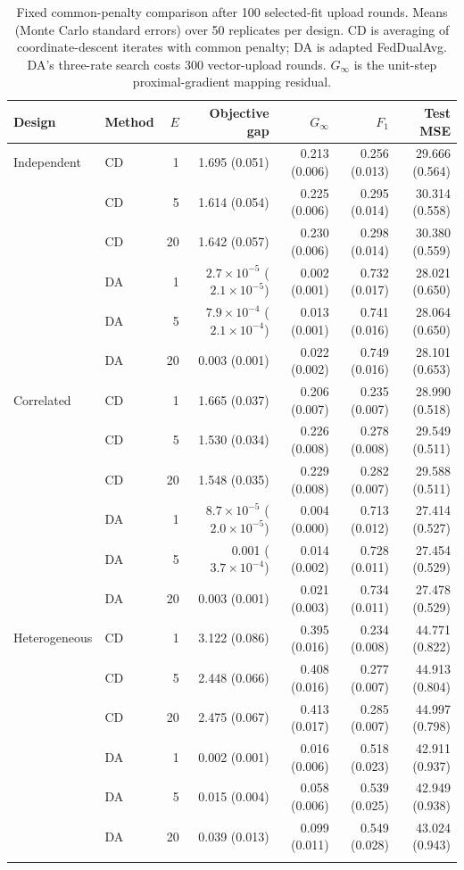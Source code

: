 \begin{table}[t]
\centering\small
\setlength{\tabcolsep}{3pt}
\caption{Fixed common-penalty comparison after 100 selected-fit upload rounds. Means (Monte Carlo standard errors) over 50 replicates per design. CD is averaging of coordinate-descent iterates with common penalty; DA is adapted FedDualAvg. DA's three-rate search costs 300 vector-upload rounds. $G_\infty$ is the unit-step proximal-gradient mapping residual.}
\label{tab:budget}
\begin{tabular}{llrrrrr}
\toprule
Design & Method & $E$ & Objective gap & $G_\infty$ & $F_1$ & Test MSE \\
\midrule
Independent & CD & 1 & 1.695 (0.051) & 0.213 (0.006) & 0.256 (0.013) & 29.666 (0.564) \\
 & CD & 5 & 1.614 (0.054) & 0.225 (0.006) & 0.295 (0.014) & 30.314 (0.558) \\
 & CD & 20 & 1.642 (0.057) & 0.230 (0.006) & 0.298 (0.014) & 30.380 (0.559) \\
 & DA & 1 & $2.7\times10^{-5}$ ($2.1\times10^{-5}$) & 0.002 (0.001) & 0.732 (0.017) & 28.021 (0.650) \\
 & DA & 5 & $7.9\times10^{-4}$ ($2.1\times10^{-4}$) & 0.013 (0.001) & 0.741 (0.016) & 28.064 (0.650) \\
 & DA & 20 & 0.003 (0.001) & 0.022 (0.002) & 0.749 (0.016) & 28.101 (0.653) \\
\addlinespace
Correlated & CD & 1 & 1.665 (0.037) & 0.206 (0.007) & 0.235 (0.007) & 28.990 (0.518) \\
 & CD & 5 & 1.530 (0.034) & 0.226 (0.008) & 0.278 (0.008) & 29.549 (0.511) \\
 & CD & 20 & 1.548 (0.035) & 0.229 (0.008) & 0.282 (0.007) & 29.588 (0.511) \\
 & DA & 1 & $8.7\times10^{-5}$ ($2.0\times10^{-5}$) & 0.004 (0.000) & 0.713 (0.012) & 27.414 (0.527) \\
 & DA & 5 & 0.001 ($3.7\times10^{-4}$) & 0.014 (0.002) & 0.728 (0.011) & 27.454 (0.529) \\
 & DA & 20 & 0.003 (0.001) & 0.021 (0.003) & 0.734 (0.011) & 27.478 (0.529) \\
\addlinespace
Heterogeneous & CD & 1 & 3.122 (0.086) & 0.395 (0.016) & 0.234 (0.008) & 44.771 (0.822) \\
 & CD & 5 & 2.448 (0.066) & 0.408 (0.016) & 0.277 (0.007) & 44.913 (0.804) \\
 & CD & 20 & 2.475 (0.067) & 0.413 (0.017) & 0.285 (0.007) & 44.997 (0.798) \\
 & DA & 1 & 0.002 (0.001) & 0.016 (0.006) & 0.518 (0.023) & 42.911 (0.937) \\
 & DA & 5 & 0.015 (0.004) & 0.058 (0.006) & 0.539 (0.025) & 42.949 (0.938) \\
 & DA & 20 & 0.039 (0.013) & 0.099 (0.011) & 0.549 (0.028) & 43.024 (0.943) \\
\addlinespace
\bottomrule
\end{tabular}
\end{table}
